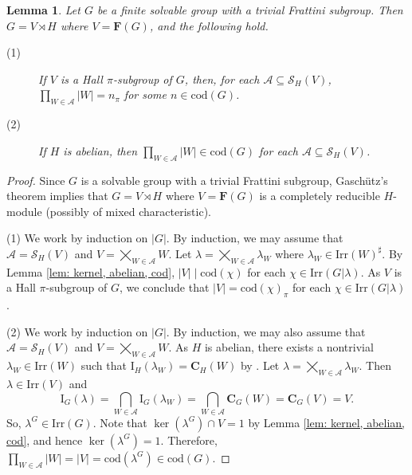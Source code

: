 \documentclass[9pt]{article}
\newtheorem{lem}{\bf Lemma}[section]
\begin{document}
\begin{lem}\label{lem: large orbit}
	Let $G$ be a finite solvable group with a trivial Frattini subgroup.
	Then $G=V \rtimes H$ where $V=\mathbf{F}(G)$, and the following hold.
	\begin{description}
		\item[(1)] If $V$ is a Hall $\pi$-subgroup of $G$, then, for each $\mathcal{A} \subseteq \mathcal{S}_H(V)$, $\prod_{W\in \mathcal{A}}|W|=n_{\pi}$ for some $n \in \mathrm{cod}(G)$.
		\item[(2)] If $H$ is abelian, then $\prod_{W\in \mathcal{A}}|W| \in \mathrm{cod}(G)$ for each $\mathcal{A} \subseteq \mathcal{S}_H(V)$.
	\end{description}
\end{lem}
\begin{proof} 
    Since $G$ is a solvable group with a trivial Frattini subgroup, Gasch\"utz's theorem \cite[Theorem 1.12]{manzwolf1992}
	implies that $G=V \rtimes H$ where $V=\mathbf{F}(G)$ is a completely reducible $H$-module (possibly of mixed characteristic).

	(1) We work by induction on $|G|$.
    By induction, we may assume that $\mathcal{A}=\mathcal{S}_H(V)$ and $V=\bigtimes_{W\in \mathcal{A}} W$.
    Let  $\lambda=\bigtimes_{W\in \mathcal{A}} \lambda_W$ where $\lambda_W\in \mathrm{Irr}(W)^\sharp$.
	By Lemma \ref{lem: kernel, abelian, cod}, $|V|\mid \mathrm{cod}(\chi)$ for each $\chi \in \mathrm{Irr}(G|\lambda)$.
	As $V$ is a Hall $\pi$-subgroup of $G$,
	we conclude that $|V|=\mathrm{cod}(\chi)_{\pi}$ for each $\chi \in \mathrm{Irr}(G|\lambda)$.  
	
	(2)  	
	We work by induction on $|G|$.
    By induction, we may also assume that $\mathcal{A}=\mathcal{S}_H(V)$ and $V=\bigtimes_{W\in \mathcal{A}} W$.
    As $H$ is abelian, there exists a nontrivial $\lambda_W\in \mathrm{Irr}(W)$
	such that $\mathrm{I}_{H}(\lambda_W) =\mathbf{C}_{H}(W)$ by \cite[\S 19, Lemma 19.16]{huppertcharactertheory}.
    Let $\lambda=\bigtimes_{W\in \mathcal{A}} \lambda_W$.
    Then $\lambda \in \mathrm{Irr}(V)$ and 
	$$\mathrm{I}_{G}(\lambda) =\bigcap_{W\in \mathcal{A}} \mathrm{I}_{G}(\lambda_W) =\bigcap_{W\in \mathcal{A}} \mathbf{C}_{G}(W) =\mathbf{C}_{G}(V) =V.$$
	So, $\lambda^{G}\in \mathrm{Irr}(G)$.
	Note that $\ker(\lambda^{G})\cap V=1$ by Lemma \ref{lem: kernel, abelian, cod},
	and hence $\ker(\lambda^{G})=1$.
Therefore, $\prod_{W\in \mathcal{A}}|W|=|V|=\mathrm{cod}(\lambda^{G})\in \mathrm{cod}(G)$.
\end{proof}
\end{document}
